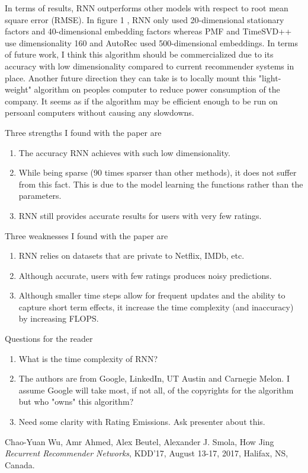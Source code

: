 \documentclass[12pt]{article}
\theoremstyle{remark}
\begin{document}
	In terms of results, RNN outperforms other models with respect to root mean square error (RMSE). In figure 1 , RNN only used 20-dimensional stationary factors and 40-dimensional embedding factors whereas PMF and TimeSVD++ use dimensionality 160 and AutoRec used 500-dimensional embeddings. In terms of future work, I think this algorithm should be commercialized due to its accuracy with low dimensionality compared to current recommender systems in place. Another future direction they can take is to locally mount this "light-weight" algorithm on peoples computer to reduce power consumption of the company. It seems as if the algorithm may be efficient enough to be run on persoanl computers without causing any slowdowns. 
	
	\newpage
	
	Three strengths I found with the paper are
	\begin{enumerate}
		\item The accuracy RNN achieves with such low dimensionality.
		\item While being sparse (90 times sparser than other methods), it does not suffer from this fact. This is due to the model learning the functions rather than the parameters.
		\item RNN still provides accurate results for users with very few ratings.
	\end{enumerate} 
	\vspace{0.5cm}
	
	Three weaknesses I found with the paper are
	\begin{enumerate}
		\item RNN relies on datasets that are private to Netflix, IMDb, etc. 
		\item Although accurate, users with few ratings produces noisy predictions.
		\item Although smaller time steps allow for frequent updates and the ability to capture short term effects, it increase the time complexity (and inaccuracy) by increasing FLOPS.
	\end{enumerate}
	\vspace{0.5cm}
	
	Questions for the reader
	\begin{enumerate}
		\item What is the time complexity of RNN?
		\item The authors are from Google, LinkedIn, UT Austin and Carnegie Melon. I assume Google will take most, if not all, of the copyrights for the algorithm but who "owns" this algorithm?
		\item Need some clarity with Rating Emissions. Ask presenter about this.
	\end{enumerate}
	\vspace{0.5cm}
	
	\begin{thebibliography}{unsrt}
		Chao-Yuan Wu, Amr Ahmed, Alex Beutel, Alexander J. Smola, How Jing \emph{Recurrent Recommender Networks}, KDD’17, August 13-17, 2017, Halifax, NS, Canada.
	\end{thebibliography}
	
\end{document}
